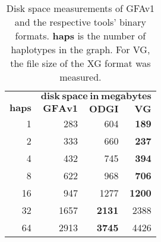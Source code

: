 \begin{table}[!ht]
	\centering
	\caption{\label{tab:disk_space} Disk space measurements of GFAv1 and the respective tools' binary formats. \textbf{haps} is the number of haplotypes in the graph. For VG, the file size of the XG format was measured.}
	\begin{tabular}{@{}rr|rr@{}}
		& \multicolumn{3}{c}{$\mathbf{disk\ space\ in\ megabytes}$} \\ \cmidrule(lr){2-4}
		{$\mathbf{haps}$} & {$\mathbf{GFAv1}$} & {$\mathbf{ODGI}$} & {$\mathbf{VG}$} \\ \hline
		1 & 283 & 604 & \textbf{189} \\ 
		2 & 333 & 660 & \textbf{237} \\ 
		4 & 432 & 745 & \textbf{394} \\ 
		8 & 622 & 968 & \textbf{706} \\ 
		16 & 947 & 1277 & \textbf{1200} \\ 
		32 & 1657 & \textbf{2131} & 2388 \\ 
		64 & 2913 & \textbf{3745} & 4426 \\ \bottomrule
	\end{tabular}
\end{table}